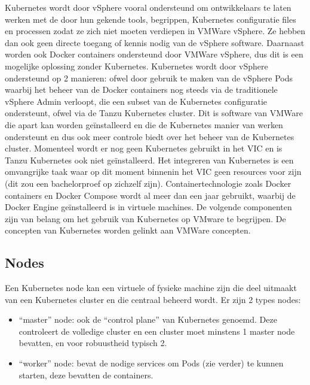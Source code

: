 \newline
\newline
Kubernetes wordt door vSphere vooral ondersteund om ontwikkelaars te laten werken met de door hun gekende tools, begrippen, Kubernetes configuratie files en processen zodat ze zich niet moeten verdiepen in VMWare vSphere. Ze hebben dan ook geen directe toegang of kennis nodig van de vSphere software.\autocite{VMware2019}
\newline
\newline
Daarnaast worden ook Docker containers ondersteund door VMWare vSphere, dus dit is een mogelijke oplossing zonder Kubernetes.
\newline
\newline
Kubernetes wordt door vSphere ondersteund op 2 manieren: ofwel door gebruik te maken van de vSphere Pods waarbij het beheer van de Docker containers nog steeds via de traditionele vSphere Admin verloopt, die een subset van de Kubernetes configuratie ondersteunt, ofwel via de Tanzu Kubernetes cluster. Dit is software van VMWare die apart kan worden geïnstalleerd en die de Kubernetes manier van werken ondersteunt en dus ook meer controle biedt over het beheer van de Kubernetes cluster.
\newline
\newline
Momenteel wordt er nog geen Kubernetes gebruikt in het VIC en is Tanzu Kubernetes ook niet geïnstalleerd. Het integreren van Kubernetes is een omvangrijke taak waar op dit moment binnenin het VIC geen resources voor zijn (dit zou een bachelorproef op zichzelf zijn).
\newline
Containertechnologie zoals Docker containers en Docker Compose wordt al meer dan een jaar gebruikt, waarbij de Docker Engine geïnstalleerd is in virtuele machines.
\newline
\newline
De volgende componenten zijn van belang om het gebruik van Kubernetes op VMware te begrijpen. De concepten van Kubernetes worden gelinkt aan VMWare concepten.
\newline
\newline
\subsection{Nodes}
Een Kubernetes node kan een virtuele of fysieke machine zijn die deel uitmaakt van een Kubernetes cluster en die centraal beheerd wordt.
Er zijn 2 types nodes:
\begin{itemize}
    \item ``master'' node: ook de ``control plane'' van Kubernetes genoemd. Deze controleert de volledige cluster en een cluster moet minstens 1 master node bevatten, en voor robuustheid typisch 2.
    \item ``worker'' node: bevat de nodige services om Pods (zie verder) te kunnen starten, deze bevatten de containers.
\end{itemize}
\autocite{NirShtein2023}

